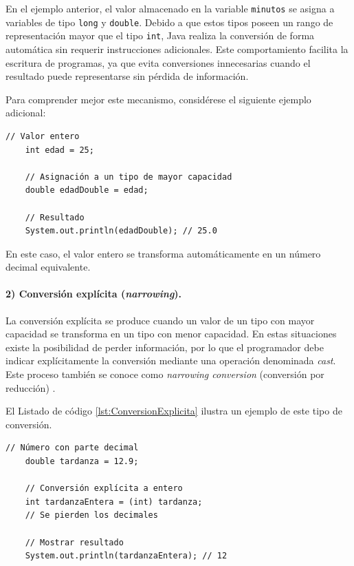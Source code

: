\documentclass[12pt,twoside]{book}
\begin{document}
						\noindent
						En el ejemplo anterior, el valor almacenado en la variable \texttt{minutos} se asigna a variables de tipo \texttt{long} y \texttt{double}. Debido a que estos tipos poseen un rango de representación mayor que el tipo \texttt{int}, Java realiza la conversión de forma automática sin requerir instrucciones adicionales. Este comportamiento facilita la escritura de programas, ya que evita conversiones innecesarias cuando el resultado puede representarse sin pérdida de información.
						
						Para comprender mejor este mecanismo, considérese el siguiente ejemplo adicional:
						
						\begin{lstlisting}[style=Java,caption={Ejemplo adicional de conversión automática.},label={lst:ConversionAutomatica2}]
	// Valor entero
	int edad = 25;
	
	// Asignación a un tipo de mayor capacidad
	double edadDouble = edad;
	
	// Resultado
	System.out.println(edadDouble); // 25.0 \end{lstlisting}
						
						\noindent
						En este caso, el valor entero se transforma automáticamente en un número decimal equivalente.
						
						\paragraph{2) Conversión explícita (\textit{narrowing}).}
						La conversión explícita se produce cuando un valor de un tipo con mayor capacidad se transforma en un tipo con menor capacidad. En estas situaciones existe la posibilidad de perder información, por lo que el programador debe indicar explícitamente la conversión mediante una operación denominada \textit{cast}. Este proceso también se conoce como \textit{narrowing conversion} (conversión por reducción) \cite{Gosling2014JavaLanguageSpec}.
						
						El Listado de código \ref{lst:ConversionExplicita} ilustra un ejemplo de este tipo de conversión.
						
						\begin{lstlisting}[style=Java,caption={Conversión explícita: double a int mediante cast.},label={lst:ConversionExplicita}]
	// Número con parte decimal
	double tardanza = 12.9;
	
	// Conversión explícita a entero
	int tardanzaEntera = (int) tardanza;
	// Se pierden los decimales
	
	// Mostrar resultado
	System.out.println(tardanzaEntera); // 12 \end{lstlisting}
						
\end{document}

